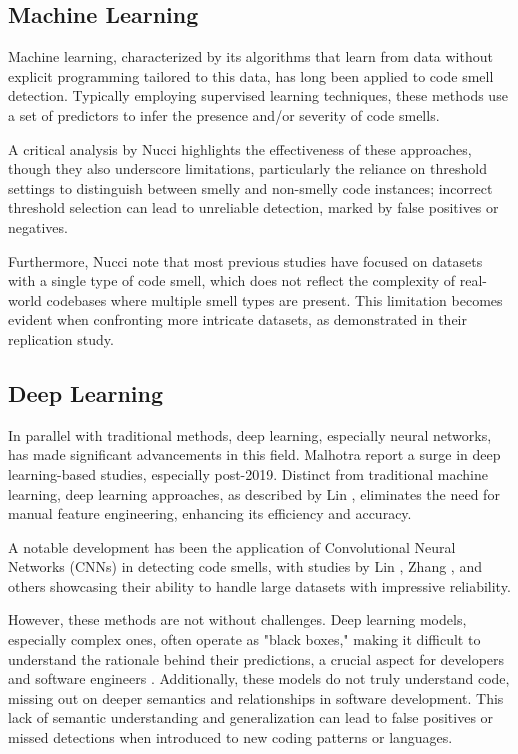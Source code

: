 \subsection{Machine Learning}
Machine learning, characterized by its algorithms that learn from data without explicit programming tailored to this data, has long been applied to code smell detection. Typically employing supervised learning techniques, these methods use a set of predictors to infer the presence and/or severity of code smells. 

A critical analysis by Nucci \etal\cite{Nucci_Dario_Palomba_2018} highlights the effectiveness of these approaches, though they also underscore limitations, particularly the reliance on threshold settings to distinguish between smelly and non-smelly code instances; incorrect threshold selection can lead to unreliable detection, marked by false positives or negatives. 

Furthermore, Nucci \etal\cite{Nucci_Dario_Palomba_2018} note that most previous studies have focused on datasets with a single type of code smell, which does not reflect the complexity of real-world codebases where multiple smell types are present. This limitation becomes evident when confronting more intricate datasets, as demonstrated in their replication study.


\subsection{Deep Learning}

In parallel with traditional methods, deep learning, especially neural networks, has made significant advancements in this field. Malhotra \etal\cite{Malhotra_Jain_Kessentini_2023} report a surge in deep learning-based studies, especially post-2019. Distinct from traditional machine learning, deep learning approaches, as described by Lin \etal\cite{Lin_Fu_Chen_Li_2021}, eliminates the need for manual feature engineering, enhancing its efficiency and accuracy. 

A notable development has been the application of Convolutional Neural Networks (CNNs) in detecting code smells, with studies by Lin \etal \cite{Lin_Fu_Chen_Li_2021}, Zhang \etal \cite{Zhang_Kishi_2023}, and others showcasing their ability to handle large datasets with impressive reliability. 

However, these methods are not without challenges. Deep learning models, especially complex ones, often operate as "black boxes," making it difficult to understand the rationale behind their predictions, a crucial aspect for developers and software engineers \cite{Malhotra_Jain_Kessentini_2023}. Additionally, these models do not truly understand code, missing out on deeper semantics and relationships in software development. This lack of semantic understanding and generalization can lead to false positives or missed detections when introduced to new coding patterns or languages.

